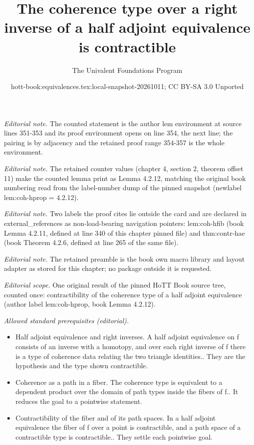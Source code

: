 \documentclass[10pt,a4paper]{article}
\title{The coherence type over a right inverse of a half adjoint equivalence is contractible}
\author{The Univalent Foundations Program}
\date{hott-book:equivalences.tex:local-snapshot-20261011; CC BY-SA 3.0 Unported}
\newcounter{chapter}
\theoremstyle{definition}
\theoremstyle{remark}
\numberwithin{equation}{section}
\begin{document}
\maketitle
\setcounter{chapter}{4}
\setcounter{section}{2}
\setcounter{thm}{11}
\noindent\textit{Editorial note.} The counted statement is the author lem environment at source lines 351-353 and its proof environment opens on line 354, the next line; the pairing is by adjacency and the retained proof range 354-357 is the whole environment.\par\medskip
\noindent\textit{Editorial note.} The retained counter values (chapter 4, section 2, theorem offset 11) make the counted lemma print as Lemma 4.2.12, matching the original book numbering read from the label-number dump of the pinned snapshot (newlabel lem:coh-hprop = 4.2.12).\par\medskip
\noindent\textit{Editorial note.} Two labels the proof cites lie outside the card and are declared in external\_references as non-load-bearing navigation pointers: lem:coh-hfib (book Lemma 4.2.11, defined at line 340 of this chapter pinned file) and thm:contr-hae (book Theorem 4.2.6, defined at line 265 of the same file).\par\medskip
\noindent\textit{Editorial note.} The retained preamble is the book own macro library and layout adapter as stored for this chapter; no package outside it is requested.\par\medskip
\noindent\textit{Editorial scope.} One original result of the pinned HoTT Book source tree, counted once: contractibility of the coherence type of a half adjoint equivalence (author label lem:coh-hprop, book Lemma 4.2.12).\par\medskip
\noindent\textit{Allowed standard prerequisites (editorial).}\begin{itemize}
\item Half adjoint equivalence and right inverses. A half adjoint equivalence on f consists of an inverse with a homotopy, and over each right inverse of f there is a type of coherence data relating the two triangle identities.. They are the hypothesis and the type shown contractible.
\item Coherence as a path in a fiber. The coherence type is equivalent to a dependent product over the domain of path types inside the fibers of f.. It reduces the goal to a pointwise statement.
\item Contractibility of the fiber and of its path spaces. In a half adjoint equivalence the fiber of f over a point is contractible, and a path space of a contractible type is contractible.. They settle each pointwise goal.
\end{itemize}\medskip
\end{document}
